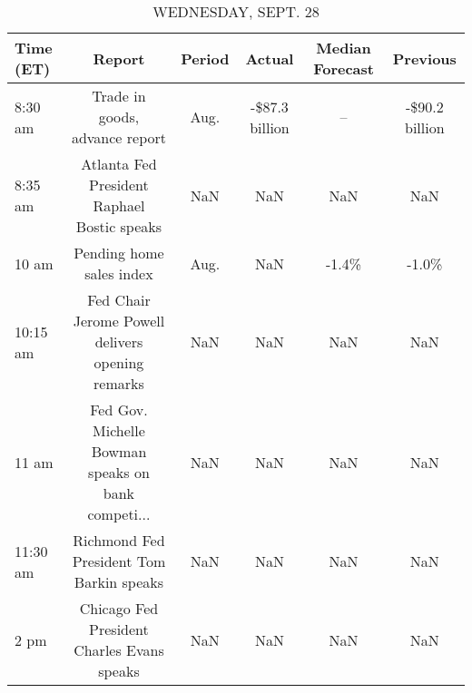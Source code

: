 \documentclass{book}
\begin{document}
  
  \begin{table}[htbp]%
  \caption{WEDNESDAY, SEPT. 28}%
  \centering%
  \begin{adjustbox}{width=1\textwidth}%
  \begin{tabular}{lccccc}
  \toprule
  Time (ET) &                                             Report & Period &         Actual & Median Forecast &       Previous \\
  \midrule
    8:30 am &                     Trade in goods, advance report &   Aug. & -\$87.3 billion &              -- & -\$90.2 billion \\
    8:35 am &        Atlanta Fed President Raphael Bostic speaks &    NaN &            NaN &             NaN &            NaN \\
      10 am &                           Pending home sales index &   Aug. &            NaN &           -1.4\% &          -1.0\% \\
   10:15 am &   Fed Chair Jerome Powell delivers opening remarks &    NaN &            NaN &             NaN &            NaN \\
      11 am & Fed Gov. Michelle Bowman speaks on bank competi... &    NaN &            NaN &             NaN &            NaN \\
   11:30 am &           Richmond Fed President Tom Barkin speaks &    NaN &            NaN &             NaN &            NaN \\
       2 pm &         Chicago Fed President Charles Evans speaks &    NaN &            NaN &             NaN &            NaN \\
  \bottomrule
  \end{tabular}
  \end{adjustbox}%
  \end{table}
  
  
\end{document}
